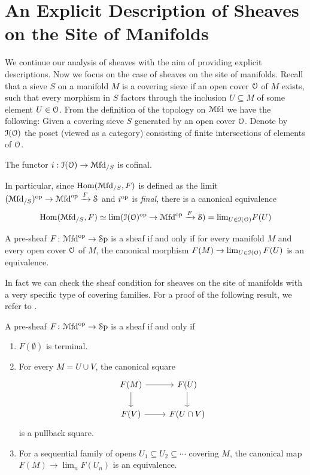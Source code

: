 \documentclass[10pt]{amsart}
\begin{document}
\section{An Explicit Description of Sheaves on the Site of Manifolds}
We continue our analysis of sheaves with the aim of providing explicit descriptions. Now we focus on the case of sheaves on the site of manifolds. Recall that a sieve $S$ on a manifold $M$ is a covering sieve if an open cover $\mathcal{O}$ of $M$ exists, such that every morphism in $S$ factors through the inclusion $U\subseteq M$ of some element $U\in\mathcal{O}$. From the definition of the topology on $\mathcal{M}\mathrm{fd}$ we have the following: Given a covering sieve $S$ generated by an open cover $\mathcal{O}$. Denote by $\mathcal{I}(\mathcal{O})$ the poset (viewed as a category) consisting of finite intersections of elements of $\mathcal{O}$.
\begin{lemma}
	The functor $i:\mathcal{I}(\mathcal{O})\rightarrow\mathcal{M}\mathrm{fd}_{/S}$ is cofinal.
\end{lemma}
In particular, since $\mathrm{Hom}(\mathcal{M}\mathrm{fd}_{/S},F)$ is defined as the limit $(\mathcal{M}\mathrm{fd}_{/S})^{\mathrm{op}}\to\mathcal{M}\mathrm{fd}^{\mathrm{op}}\xrightarrow F\mathcal{S}$ and $i^{\mathrm{op}}$ is \emph{final}, there is a canonical equivalence \[\mathrm{Hom}(\mathcal{M}\mathrm{fd}_{/S},F)\simeq\lim(\mathcal{I}(\mathcal{O})^{\mathrm{op}}\to\mathcal{M}\mathrm{fd}^{\mathrm{op}}\xrightarrow F\mathcal{S})=\textrm{lim}_{U\in\mathcal{I}(\mathcal{O})}F(U)\]
\begin{proposition}\label{pro:sheaf}
  A pre-sheaf $F\colon \mathcal{M}\mathrm{fd}^{\mathrm{op}} \to \mathcal{S}\mathrm{p}$ is a sheaf if and only if for every manifold $M$ and every open cover $\mathcal{O}$ of $M$, the canonical morphism $F(M) \to \lim_{U \in \mathcal{I}(\mathcal{O})}F(U)$ is an equivalence.
\end{proposition}

In fact we can check the sheaf condition for sheaves on the site of manifolds with a very specific type of covering families. For a proof of the following result, we refer to \cite[Proposition 3.6.6]{amabeldebrayhaine2021diffcoh}.

\begin{proposition}
  A pre-sheaf $F\colon \mathcal{M}\mathrm{fd}^{\mathrm{op}} \to \mathcal{S}\mathrm{p}$ is a sheaf if and only if
  \begin{enumerate}
    \item $F(\emptyset)$ is terminal.
    \item For every $M = U \cup V$, the canonical square
    \[
      \begin{tikzcd}
        F(M) \ar[r] \ar[d] & F(U) \ar[d] \\
        F(V) \ar[r] & F(U \cap V)
      \end{tikzcd}
    \]is a pullback square. 
    \item For a sequential family of opens $U_1 \subseteq U_2 \subseteq \cdots$ covering $M$, the canonical map $F(M) \to \lim_{n} F(U_n)$ is an equivalence.
  \end{enumerate}
\end{proposition}
\end{document}
